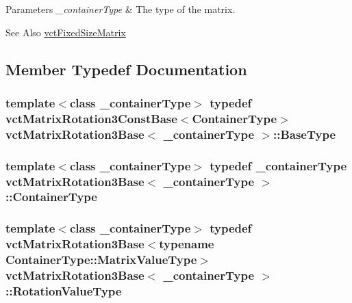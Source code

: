 \begin{DoxyParams}{Parameters}
{\em \-\_\-container\-Type} & The type of the matrix.\\
\hline
\end{DoxyParams}
\begin{DoxySeeAlso}{See Also}
\hyperlink{classvct_fixed_size_matrix}{vct\-Fixed\-Size\-Matrix} 
\end{DoxySeeAlso}


\subsection{Member Typedef Documentation}
\hypertarget{classvct_matrix_rotation3_base_a81e215f535ce137435cbafdcb0f3b6f1}{
\subsubsection[{Base\-Type}]{\setlength{\rightskip}{0pt plus 5cm}template$<$class \-\_\-container\-Type$>$ typedef {\bf vct\-Matrix\-Rotation3\-Const\-Base}$<${\bf Container\-Type}$>$ {\bf vct\-Matrix\-Rotation3\-Base}$<$ \-\_\-container\-Type $>$\-::{\bf Base\-Type}}}\label{classvct_matrix_rotation3_base_a81e215f535ce137435cbafdcb0f3b6f1}
\hypertarget{classvct_matrix_rotation3_base_ac6181bbfdbc84777f613a0bc5a6bc75a}{
\subsubsection[{Container\-Type}]{\setlength{\rightskip}{0pt plus 5cm}template$<$class \-\_\-container\-Type$>$ typedef \-\_\-container\-Type {\bf vct\-Matrix\-Rotation3\-Base}$<$ \-\_\-container\-Type $>$\-::{\bf Container\-Type}}}\label{classvct_matrix_rotation3_base_ac6181bbfdbc84777f613a0bc5a6bc75a}
\hypertarget{classvct_matrix_rotation3_base_a9cac9a0141e6b59fe9185b1121f70229}{
\subsubsection[{Rotation\-Value\-Type}]{\setlength{\rightskip}{0pt plus 5cm}template$<$class \-\_\-container\-Type$>$ typedef {\bf vct\-Matrix\-Rotation3\-Base}$<$typename Container\-Type\-::\-Matrix\-Value\-Type$>$ {\bf vct\-Matrix\-Rotation3\-Base}$<$ \-\_\-container\-Type $>$\-::{\bf Rotation\-Value\-Type}}}\label{classvct_matrix_rotation3_base_a9cac9a0141e6b59fe9185b1121f70229}
